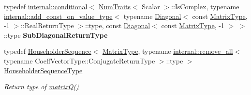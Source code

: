 \begin{DoxyCompactItemize}
typedef \mbox{\hyperlink{struct_eigen_1_1internal_1_1conditional}{internal\+::conditional}}$<$ \mbox{\hyperlink{struct_eigen_1_1_num_traits}{Num\+Traits}}$<$ Scalar $>$\+::Is\+Complex, typename \mbox{\hyperlink{struct_eigen_1_1internal_1_1add__const__on__value__type}{internal\+::add\+\_\+const\+\_\+on\+\_\+value\+\_\+type}}$<$ typename \mbox{\hyperlink{class_eigen_1_1_diagonal}{Diagonal}}$<$ const \mbox{\hyperlink{class_eigen_1_1_tridiagonalization_add0f4b2216d0ea8ee0f7d8525deaf0a9}{Matrix\+Type}}, -\/1 $>$\+::Real\+Return\+Type $>$\+::type, const \mbox{\hyperlink{class_eigen_1_1_diagonal}{Diagonal}}$<$ const \mbox{\hyperlink{class_eigen_1_1_tridiagonalization_add0f4b2216d0ea8ee0f7d8525deaf0a9}{Matrix\+Type}}, -\/1 $>$ $>$\+::type {\bfseries Sub\+Diagonal\+Return\+Type}
\item 
\mbox{\label{class_eigen_1_1_tridiagonalization_af322315c8bea9990152c9d09bfa2a69f}} 
typedef \mbox{\hyperlink{class_eigen_1_1_householder_sequence}{Householder\+Sequence}}$<$ \mbox{\hyperlink{class_eigen_1_1_tridiagonalization_add0f4b2216d0ea8ee0f7d8525deaf0a9}{Matrix\+Type}}, typename \mbox{\hyperlink{struct_eigen_1_1internal_1_1remove__all}{internal\+::remove\+\_\+all}}$<$ typename Coeff\+Vector\+Type\+::\+Conjugate\+Return\+Type $>$\+::type $>$ \mbox{\hyperlink{class_eigen_1_1_tridiagonalization_af322315c8bea9990152c9d09bfa2a69f}{Householder\+Sequence\+Type}}
\begin{DoxyCompactList}\small\item\em Return type of \mbox{\hyperlink{class_eigen_1_1_tridiagonalization_a000f7392eda930576ffd2af1fae54af2}{matrix\+Q()}} \end{DoxyCompactList}\end{DoxyCompactItemize}
